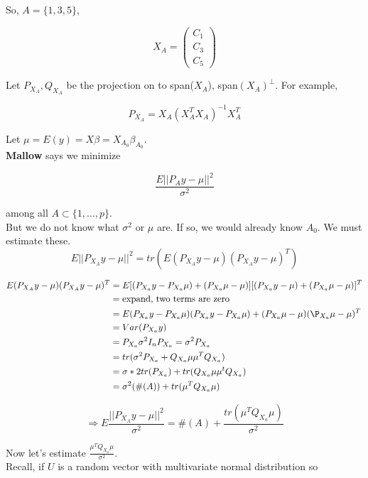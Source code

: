 \documentclass[11pt,fleqn]{book} %
\begin{document}
So, $A = \{1, 3, 5\}$, 

$$X_A = \begin{pmatrix}
	C_1\\
	C_3\\
	C_5
\end{pmatrix}$$

Let $P_{X_A}, Q_{X_A}$ be the projection on to span($X_A$), span$(X_A)^\perp$. For example, 

$$P_{X_A} = X_A(X_A^T X_A)^{-1}X_A^T $$

Let $\mu = E(y) = X\beta = X_{A_0}\beta_{A_0}$.\\

\textbf{Mallow} says we minimize

$$\frac{E||P_{A}y - \mu ||^2}{\sigma^2} $$

among all $A \subset \{1, \dots, p \}$.\\

But we do not know what $\sigma^2$ or $\mu$ are. If so, we would already know $A_0$. We must estimate these.\\

$$E || P_{X_A} y - \mu ||^2 = tr(E(P_{X_A} y - \mu)(P_{X_A} y - \mu)^T) $$

\begin{align*}
	E(P_{X_A} y - \mu)(P_{X_A} y - \mu)^T &= E[(P_{X_a}y - P_{X_a}\mu) + (P_{X_a}\mu - \mu)][(P_{X_a}y - \mu)+ (P_{X_a}\mu - \mu)]^T\\
		&=  \text{expand, two terms are zero}\\
		&= E(P_{X_a}y - P_{X_a}\mu)(P_{X_a}y - P_{X_a}\mu) + (P_{X_a}\mu  - \mu)(\P_{X_a}\mu - \mu)^T\\
		&= Var(P_{X_a}y)\\
		&= P_{X_a} \sigma^2 I_n P_{X_a} = \sigma^2 P_{X_a}\\
		&= tr(\sigma^2 P_{X_a} + Q_{X_a}\mu\mu^TQ_{X_a})\\
		&= \sigma*2 tr(P_{X_a}) + tr(Q_{X_a}\mu\mu^tQ_{X_a})\\
		&= \sigma^2(\#(A)) + tr(\mu^T Q_{X_a} \mu)\\
\end{align*}

$$\Rightarrow E\frac{ || P_{X_A} y - \mu ||^2}{\sigma^2} = \#(A) + \frac{tr(\mu^T Q_{X_a} \mu)}{\sigma^2}$$

Now let's estimate $\frac{\mu^T Q_{X_a} \mu}{\sigma^2}$. \\

Recall, if $U$ is a random vector with multivariate normal distribution so
\end{document}
